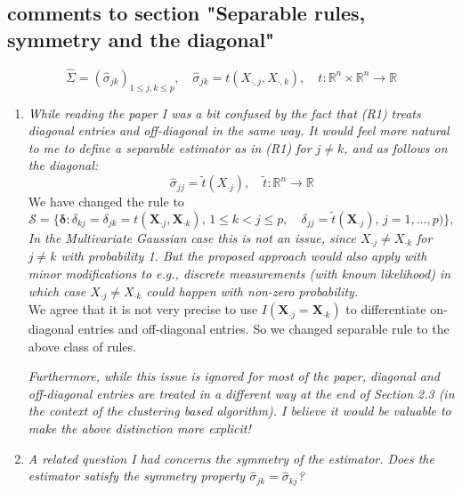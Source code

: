 \documentclass[12pt]{article}
\def\bs{\boldsymbol}
\def\bb{\mathbb}
\begin{document}
\subsection{comments to section "Separable rules, symmetry and the diagonal"}
\begin{equation}\label{R1}
\widehat{\Sigma} = (\widehat{\sigma}_{jk})_{1\leq j,k\leq p},\quad \widehat{\sigma}_{jk} = t(X_{\cdot,j}, X_{\cdot,k}), \quad t:\bb{R}^n\times \bb{R}^n\to \bb{R}
\end{equation}
\begin{enumerate}
\item \emph{While reading the paper I was a bit confused by the fact that (R1) treats diagonal entries and off-diagonal in the same way. It would feel more natural to me to define a separable estimator as in (R1) for $j\neq k$, and as follows on the diagonal:}
$$\hat{\sigma}_{jj} = \tilde{t}(X_{\cdot j}),\quad \tilde{t}:\bb{R}^n \to \bb{R}$$
We have changed the rule to 
\begin{equation}
  \label{separable}
  \mathcal{S} = \{\bs{\delta} : \delta_{kj} = \delta_{jk} = t(\bs{X}_{\cdot j}, \bs{X}_{\cdot k}),\, 1\leq k<j\leq p,\quad 
   \delta_{jj} = \widetilde{t}(\bs{X}_{\cdot j}),\,j=1,\ldots,p)\},
\end{equation}
\emph{In the Multivariate Gaussian case this is not an issue, since $X_{\cdot j}\neq X_{\cdot k}$ for $j\neq k$ with probability 1. But the proposed approach would also apply with minor modifications to e.g., discrete measurements (with known likelihood) in which case $X_{\cdot j}\neq X_{\cdot k}$ could happen with non-zero probability.} \\
We agree that it is not very precise to use $I(\bs{X}_{\cdot j}=\bs{X}_{\cdot k})$ to differentiate on-diagonal entries and off-diagonal entries. So we changed separable rule to the above class of rules.

\emph{Furthermore, while this issue is ignored for most of the paper, diagonal and off-diagonal entries are treated in a different way at the end of Section 2.3 (in the context of the clustering based algorithm). I believe it would be valuable to make the above distinction more explicit!}
\item \emph{A related question I had concerns the symmetry of the estimator. Does the estimator satisfy the symmetry property $\hat{\sigma}_{jk} =\hat{\sigma}_{kj}$? } 


\end{enumerate}
\end{document}
